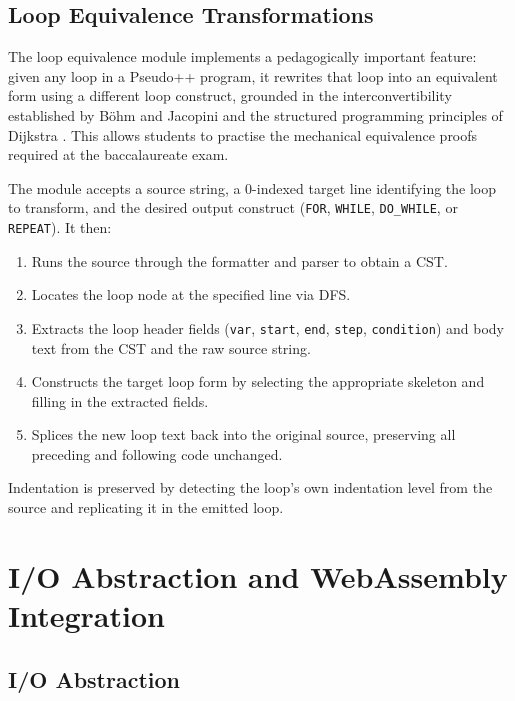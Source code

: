 \subsection{Loop Equivalence Transformations}
\label{subsec:loop-transforms}

The loop equivalence module implements a pedagogically important feature:
given any loop in a Pseudo++ program, it rewrites that loop into an
equivalent form using a different loop construct, grounded in the
interconvertibility established by Böhm and Jacopini \cite{bohm-jacopini}
and the structured programming principles of Dijkstra \cite{dijkstra1968goto}.
This allows students to practise the mechanical equivalence proofs required
at the baccalaureate exam.

The module accepts a source string, a 0-indexed target line identifying the
loop to transform, and the desired output construct (\texttt{FOR},
\texttt{WHILE}, \texttt{DO\_WHILE}, or \texttt{REPEAT}).  It then:

\begin{enumerate}
  \item Runs the source through the formatter and parser to obtain a CST.
  \item Locates the loop node at the specified line via DFS.
  \item Extracts the loop header fields (\texttt{var}, \texttt{start},
        \texttt{end}, \texttt{step}, \texttt{condition}) and body text from
        the CST and the raw source string.
  \item Constructs the target loop form by selecting the appropriate skeleton
        and filling in the extracted fields.
  \item Splices the new loop text back into the original source, preserving
        all preceding and following code unchanged.
\end{enumerate}

Indentation is preserved by detecting the loop's own indentation level from
the source and replicating it in the emitted loop.

\section{I/O Abstraction and WebAssembly Integration}
\label{sec:wasm}

\subsection{I/O Abstraction}

